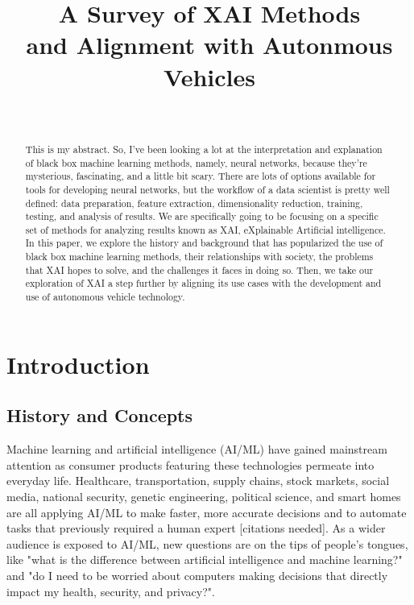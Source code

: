 \documentclass{IEEEtran}
\begin{document}
\title{A Survey of XAI Methods\\and Alignment with Autonmous Vehicles}
\author{
    \\
}
\maketitle

\begin{abstract}
This is my abstract.  So, I've been looking a lot at the interpretation and explanation of black box machine learning methods, namely, neural networks, because they're mysterious, fascinating, and a little bit scary.  There are lots of options available for tools for developing neural networks, but the workflow of a data scientist is pretty well defined:  data preparation, feature extraction, dimensionality reduction, training, testing, and analysis of results.  We are specifically going to be focusing on a specific set of methods for analyzing results known as XAI, eXplainable Artificial intelligence.  In this paper, we explore the history and background that has popularized the use of black box machine learning methods, their relationships with society, the problems that XAI hopes to solve, and the challenges it faces in doing so.  Then, we take our exploration of XAI a step further by aligning its use cases with the development and use of autonomous vehicle technology.
\end{abstract}

\section{Introduction}

\subsection{History and Concepts}

Machine learning and artificial intelligence (AI/ML) have gained mainstream attention as consumer products featuring these technologies permeate into everyday life.  Healthcare, transportation, supply chains, stock markets, social media, national security, genetic engineering, political science, and smart homes are all applying AI/ML to make faster, more accurate decisions and to automate tasks that previously required a human expert [citations needed].  As a wider audience is exposed to AI/ML, new questions are on the tips of people's tongues, like "what is the difference between artificial intelligence and machine learning?" and "do I need to be worried about computers making decisions that directly impact my health, security, and privacy?".
\end{document}
